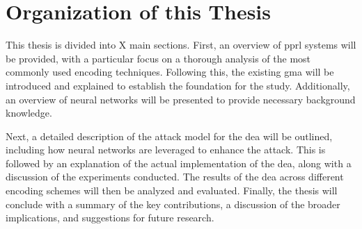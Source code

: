 \section{Organization of this Thesis}  \label{sec:orga}

This thesis is divided into X main sections.
First, an overview of \ac{pprl} systems will be provided, with a particular focus on a thorough analysis of the most commonly used encoding techniques.
Following this, the existing \ac{gma} will be introduced and explained to establish the foundation for the study.
Additionally, an overview of neural networks will be presented to provide necessary background knowledge.

Next, a detailed description of the attack model for the \ac{dea} will be outlined, including how neural networks are leveraged to enhance the attack.
This is followed by an explanation of the actual implementation of the \ac{dea}, along with a discussion of the experiments conducted.
The results of the \ac{dea} across different encoding schemes will then be analyzed and evaluated.
Finally, the thesis will conclude with a summary of the key contributions, a discussion of the broader implications, and suggestions for future research.